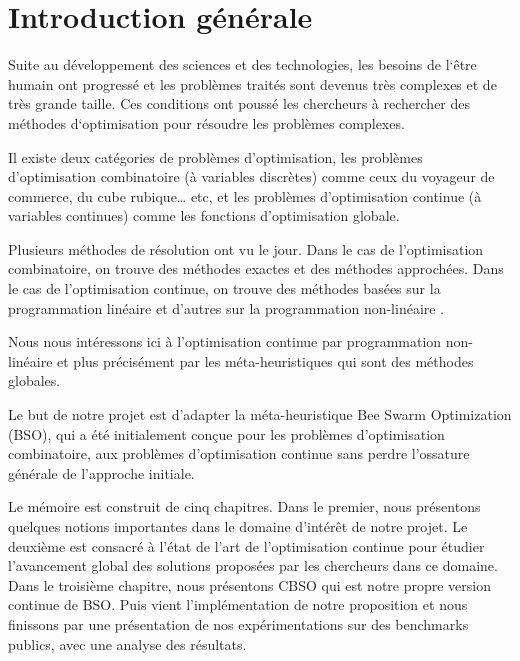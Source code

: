 \chapter*{Introduction générale}

Suite au développement des sciences et des technologies, les
besoins de l‘être humain ont progressé et les problèmes traités sont
devenus très complexes et de très grande taille. Ces conditions ont
poussé les chercheurs à rechercher des méthodes d‘optimisation pour
résoudre les problèmes complexes.

Il existe deux catégories de problèmes d'optimisation, les problèmes d'optimisation combinatoire (à
variables discrètes) comme ceux du voyageur de commerce, du cube rubique… etc,
et les problèmes d'optimisation continue (à variables continues) comme les fonctions d'optimisation globale.

Plusieurs méthodes de résolution ont vu le jour. Dans le cas de l'optimisation combinatoire, on trouve des méthodes exactes et des méthodes approchées. Dans le cas de l’optimisation
continue, on trouve des méthodes basées sur la programmation linéaire et
d'autres sur la programmation non-linéaire \cite{boussaid}. 

Nous nous intéressons ici à l'optimisation continue par programmation non-linéaire et plus précisément par les méta-heuristiques qui sont des méthodes globales.

Le but de notre projet est d'adapter la méta-heuristique Bee Swarm Optimization (BSO), qui a été initialement conçue pour les problèmes d'optimisation combinatoire, aux problèmes d'optimisation continue sans perdre l'ossature générale de l’approche initiale.

Le mémoire est construit de cinq chapitres. Dans le premier, nous présentons quelques notions importantes dans le domaine
d'intérêt de notre projet. Le deuxième est consacré à l'état de l'art de l'optimisation continue pour étudier l'avancement global des solutions proposées par les chercheurs dans ce domaine. Dans le troisième chapitre, nous présentons CBSO qui est notre propre version continue de BSO. Puis vient l'implémentation de notre proposition et nous finissons par une présentation de nos expérimentations sur des benchmarks publics, avec une analyse des résultats.